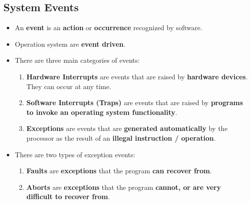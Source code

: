 \documentclass[16pt]{article}
\begin{document}
    \subsection*{System Events}
    \begin{itemize}
        \item An \textbf{event} is an \textbf{action} or \textbf{occurrence} recognized by software.
        \item Operation system are \textbf{event driven}.
        \item There are three main categories of events:
        \begin{enumerate}
            \item \textbf{Hardware Interrupts} are events that are raised by \textbf{hardware devices}. They can occur at any time.
            \item \textbf{Software Interrupts (Traps)} are events that are raised by \textbf{programs to invoke an operating system functionality}.
            \item \textbf{Exceptions} are events that are \textbf{generated automatically} by the processor as the result of an \textbf{illegal instruction / operation}.
        \end{enumerate}
        \item There are two types of exception events:
        \begin{enumerate}
            \item \textbf{Faults} are \textbf{exceptions} that the program \textbf{can 
            recover from}.
            \item \textbf{Aborts} are \textbf{exceptions} that the program \textbf{cannot, or are very difficult to recover from}.
        \end{enumerate}
    \end{itemize}
\end{document}

